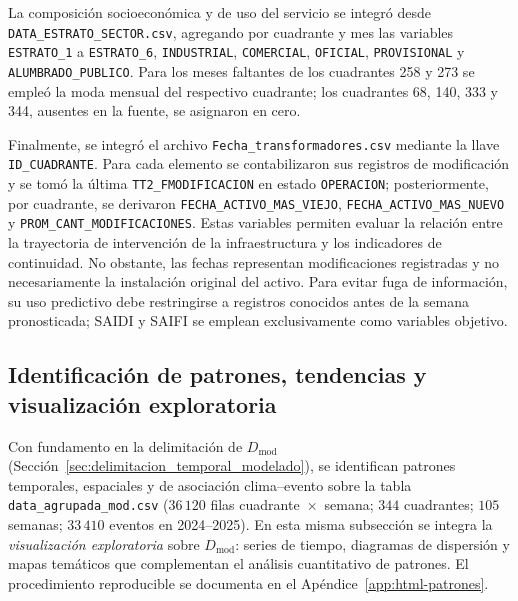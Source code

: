     La composición socioeconómica y de uso del servicio se integró desde
    \texttt{DATA\_ESTRATO\_SECTOR.csv}, agregando por cuadrante y mes las
    variables \texttt{ESTRATO\_1} a \texttt{ESTRATO\_6},
    \texttt{INDUSTRIAL}, \texttt{COMERCIAL}, \texttt{OFICIAL},
    \texttt{PROVISIONAL} y \texttt{ALUMBRADO\_PUBLICO}. Para los meses
    faltantes de los cuadrantes 258 y 273 se empleó la moda mensual del
    respectivo cuadrante; los cuadrantes 68, 140, 333 y 344, ausentes en la
    fuente, se asignaron en cero.

    Finalmente, se integró el archivo \texttt{Fecha\_transformadores.csv} mediante la llave \texttt{ID\_CUADRANTE}. Para cada elemento se contabilizaron
    sus registros de modificación y se tomó la última
    \texttt{TT2\_FMODIFICACION} en estado \texttt{OPERACION}; posteriormente,
    por cuadrante, se derivaron \texttt{FECHA\_ACTIVO\_MAS\_VIEJO},
    \texttt{FECHA\_ACTIVO\_MAS\_NUEVO} y
    \texttt{PROM\_CANT\_MODIFICACIONES}. Estas variables permiten evaluar la
    relación entre la trayectoria de intervención de la infraestructura y los
    indicadores de continuidad. No obstante, las fechas representan
    modificaciones registradas y no necesariamente la instalación original
    del activo. Para evitar fuga de información, su uso predictivo debe
    restringirse a registros conocidos antes de la semana pronosticada;
    SAIDI y SAIFI se emplean exclusivamente como variables objetivo.

\subsection{Identificación de patrones, tendencias y visualización exploratoria}
\label{sec:identificacion_patrones_tendencias}
    Con fundamento en la delimitación de $D_{\mathrm{mod}}$ (Sección~\ref{sec:delimitacion_temporal_modelado}), se identifican patrones temporales, espaciales y de asociación clima--evento sobre la tabla \texttt{data\_agrupada\_mod.csv} ($36\,120$ filas cuadrante~$\times$~semana; $344$ cuadrantes; $105$ semanas; $33\,410$ eventos en 2024--2025). En esta misma subsección se integra la \textit{visualización exploratoria} sobre $D_{\mathrm{mod}}$: series de tiempo, diagramas de dispersión y mapas temáticos que complementan el análisis cuantitativo de patrones. El procedimiento reproducible se documenta en el Apéndice~\ref{app:html-patrones}.
    
